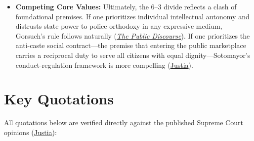 \documentclass[12pt]{article}
\begin{document}
\begin{itemize}
  \item \textbf{Competing Core Values:} Ultimately, the 6--3 divide reflects a clash of foundational premises. If one prioritizes individual intellectual autonomy and distrusts state power to police orthodoxy in any expressive medium, Gorsuch's rule follows naturally (\href{https://www.thepublicdiscourse.com/2023/07/89894/}{\textit{The Public Discourse}}). If one prioritizes the anti-caste social contract---the premise that entering the public marketplace carries a reciprocal duty to serve all citizens with equal dignity---Sotomayor's conduct-regulation framework is more compelling (\href{https://supreme.justia.com/cases/federal/us/600/21-476/}{Justia}).
\end{itemize}

\section{Key Quotations}
All quotations below are verified directly against the published Supreme Court opinions (\href{https://supreme.justia.com/cases/federal/us/600/21-476/}{Justia}):
\end{document}
